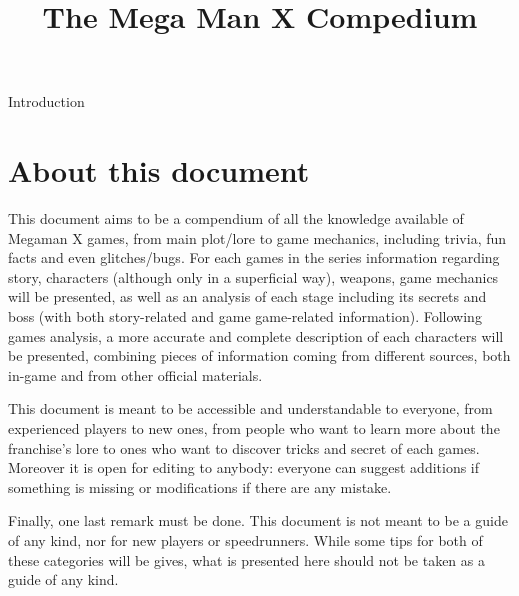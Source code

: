 \documentclass[openany]{report}
\title{The Mega Man X Compedium}
\begin{document}
\maketitle
\tableofcontents

\begin{chapter}{Introduction}
	\section{About this document}
	This document aims to be a compendium of all the knowledge available of Megaman X games, from main plot/lore to game mechanics, including trivia, fun facts and even glitches/bugs. For each games in the series information regarding story, characters (although only in a superficial way), weapons, game mechanics will be presented, as well as an analysis of each stage including its secrets and boss (with both story-related and game game-related information). Following games analysis, a more accurate and complete description of each characters will be presented, combining pieces of information coming from different sources, both in-game and from other official materials.
	
	This document is meant to be accessible and understandable to everyone, from experienced players to new ones, from people who want to learn more about the franchise's lore to ones who want to discover tricks and secret of each games. Moreover it is open for editing to anybody: everyone can suggest additions if something is missing or modifications if there are any mistake.
	
	Finally, one last remark must be done. This document is not meant to be a guide of any kind, nor for new players or speedrunners. While some tips for both of these categories will be gives, what is presented here should not be taken as a guide of any kind.
\end{chapter}
\end{document}

